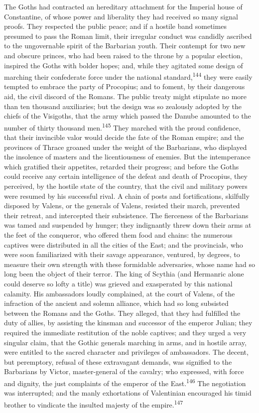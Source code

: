 The Goths had contracted an hereditary attachment for the
Imperial house of Constantine, of whose power and liberality they
had received so many signal proofs. They respected the public
peace; and if a hostile band sometimes presumed to pass the Roman
limit, their irregular conduct was candidly ascribed to the
ungovernable spirit of the Barbarian youth. Their contempt for
two new and obscure princes, who had been raised to the throne by
a popular election, inspired the Goths with bolder hopes; and,
while they agitated some design of marching their confederate
force under the national standard,\textsuperscript{144} they were easily tempted
to embrace the party of Procopius; and to foment, by their
dangerous aid, the civil discord of the Romans. The public treaty
might stipulate no more than ten thousand auxiliaries; but the
design was so zealously adopted by the chiefs of the Visigoths,
that the army which passed the Danube amounted to the number of
thirty thousand men.\textsuperscript{145} They marched with the proud confidence,
that their invincible valor would decide the fate of the Roman
empire; and the provinces of Thrace groaned under the weight of
the Barbarians, who displayed the insolence of masters and the
licentiousness of enemies. But the intemperance which gratified
their appetites, retarded their progress; and before the Goths
could receive any certain intelligence of the defeat and death of
Procopius, they perceived, by the hostile state of the country,
that the civil and military powers were resumed by his successful
rival. A chain of posts and fortifications, skilfully disposed by
Valens, or the generals of Valens, resisted their march,
prevented their retreat, and intercepted their subsistence. The
fierceness of the Barbarians was tamed and suspended by hunger;
they indignantly threw down their arms at the feet of the
conqueror, who offered them food and chains: the numerous
captives were distributed in all the cities of the East; and the
provincials, who were soon familiarized with their savage
appearance, ventured, by degrees, to measure their own strength
with these formidable adversaries, whose name had so long been
the object of their terror. The king of Scythia (and Hermanric
alone could deserve so lofty a title) was grieved and exasperated
by this national calamity. His ambassadors loudly complained, at
the court of Valens, of the infraction of the ancient and solemn
alliance, which had so long subsisted between the Romans and the
Goths. They alleged, that they had fulfilled the duty of allies,
by assisting the kinsman and successor of the emperor Julian;
they required the immediate restitution of the noble captives;
and they urged a very singular claim, that the Gothic generals
marching in arms, and in hostile array, were entitled to the
sacred character and privileges of ambassadors. The decent, but
peremptory, refusal of these extravagant demands, was signified
to the Barbarians by Victor, master-general of the cavalry; who
expressed, with force and dignity, the just complaints of the
emperor of the East.\textsuperscript{146} The negotiation was interrupted; and the
manly exhortations of Valentinian encouraged his timid brother to
vindicate the insulted majesty of the empire.\textsuperscript{147}

